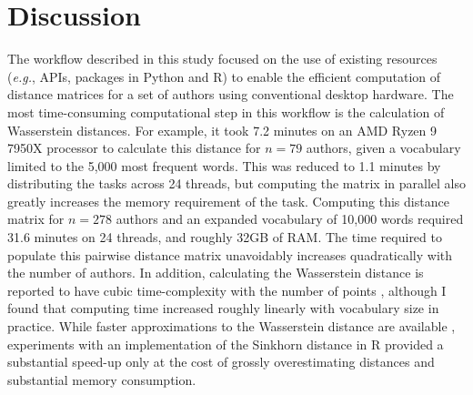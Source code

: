 \documentclass[12pt]{article}
\begin{document}
\section * {Discussion}


The workflow described in this study focused on the use of existing resources (\textit{e.g.}, APIs, packages in Python and R) to enable the efficient computation of distance matrices for a set of authors using conventional desktop hardware.
The most time-consuming computational step in this workflow is the calculation of Wasserstein distances.
For example, it took 7.2 minutes on an AMD Ryzen 9 7950X processor to calculate this distance for $n=79$ authors, given a vocabulary limited to the 5,000 most frequent words.
This was reduced to 1.1 minutes by distributing the tasks across 24 threads, but computing the matrix in parallel also greatly increases the memory requirement of the task.
Computing this distance matrix for $n=278$ authors and an expanded vocabulary of 10,000 words required 31.6 minutes on 24 threads, and roughly 32GB of RAM.
The time required to populate this pairwise distance matrix unavoidably increases quadratically with the number of authors.
In addition, calculating the Wasserstein distance is reported to have cubic time-complexity with the number of points \citep{bernton2019approximate}, although I found that computing time increased roughly linearly with vocabulary size in practice.
While faster approximations to the Wasserstein distance are available \citep[\textit{e.g.}, Sinkhorn distance;][]{cuturi2013sinkhorn}, experiments with an implementation of the Sinkhorn distance in R provided a substantial speed-up only at the cost of grossly overestimating distances and substantial memory consumption.


\end{document}
